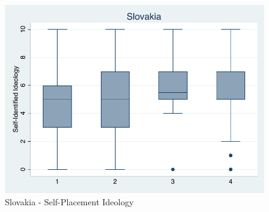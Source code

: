 \documentclass[12pt, titlepage]{article}
\begin{document}
\begin{figure}[H]
		\centering 
		\includegraphics[width=\textwidth]{IdeoBP/Slovakia}
	\caption{Slovakia - Self-Placement Ideology}
	\label{Slovakia}
\end{figure}
\end{document}
